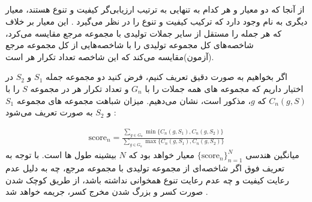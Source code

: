 \subsection{\jaccard{}}
از آنجا که دو معیار \bleu{} و \selfbleu{} هر کدام به تنهایی به ترتیب ارزیابی‌گر کیفیت و تنوع هستند، معیار دیگری به نام \jaccard{} وجود دارد که ترکیب کیفیت و تنوع را در نظر می‌گیرد \cite{jointly}. این معیار بر خلاف \bleu{} که هر جمله را مستقل از سایر جملات تولیدی با مجموعه مرجع مقایسه می‌کرد، شاخصه‌های کل مجموعه تولیدی را با شاخصه‌هایی از کل مجموعه مرجع (آزمون)‌مقایسه می‌کند که این شاخصه تعداد تکرار هر \ngramphrase{} است.

اگر بخواهیم به صورت دقیق تعریف کنیم، فرض کنید دو مجموعه جمله $S_1$ و $S_2$ در اختیار داریم که مجموعه \ngramphrase{}‌های همه جملات را با $G_n$ و تعداد تکرار هر \ngramphrase{} در مجموعه $S$ را با $C_n(g,S)$ که $g$،
\ngramphrase{}
مذکور است، نشان می‌دهیم. میزان شباهت مجموعه \ngramphrase{}‌های مجموعه $S_1$ و $S_2$ به صورت تعریف می‌شود \cite{jointly}:

\begin{gather}
	\text{score}_n = \frac
	{
		\sum_{g \in G_n} \min \{ C_n(g, S_1), C_n(g, S_2) \}
	}
	{
		\sum_{g \in G_n} \max \{ C_n(g, S_1), C_n(g, S_2) \}
	}
\end{gather}
میانگین هندسی 
$\{\text{score}_n\}_{n=1}^N$
معیار \jaccard[-N]{} خواهد بود که $N$ بیشینه طول \ngramphrase{}‌ها است.
با توجه به تعریف فوق اگر شاخصه‌ای از مجموعه تولیدی با مجموعه مرجع، چه به دلیل عدم رعایت کیفیت و چه عدم رعایت تنوع همخوانی نداشته باشد، از طریق کوچک شدن صورت کسر و بزرگ شدن مخرج کسر، جریمه خواهد شد \cite{jointly}.
